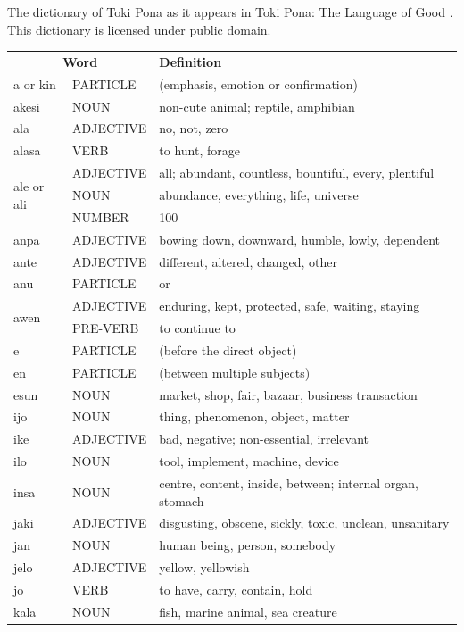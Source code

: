 \documentclass[14pt, a4paper]{extreport}
\begin{document}
The dictionary of Toki Pona as it appears in Toki Pona: The Language of Good \parencite[125-134]{pu}. This dictionary is licensed under public domain.
\begin{longtable}{llp{10cm}}
  \multicolumn{2}{c}{\textbf{Word}} & \textbf{Definition} \\
  a or kin & PARTICLE & (emphasis, emotion or confirmation) \\
  akesi & NOUN & non-cute animal; reptile, amphibian \\
  ala & ADJECTIVE & no, not, zero \\
  alasa & VERB & to hunt, forage \\
  \multirow[t]{3}{*}{ale or ali} & ADJECTIVE & all; abundant, countless, bountiful, every, plentiful \\
  & NOUN & abundance, everything, life, universe \\
  & NUMBER & 100 \\
  anpa & ADJECTIVE & bowing down, downward, humble, lowly, dependent \\
  ante & ADJECTIVE & different, altered, changed, other \\
  anu & PARTICLE & or \\
  \multirow[t]{2}{*}{awen} & ADJECTIVE & enduring, kept, protected, safe, waiting, staying \\
  & PRE-VERB & to continue to \\
  e & PARTICLE & (before the direct object) \\
  en & PARTICLE & (between multiple subjects) \\
  esun & NOUN & market, shop, fair, bazaar, business transaction \\
  ijo & NOUN & thing, phenomenon, object, matter \\
  ike & ADJECTIVE & bad, negative; non-essential, irrelevant \\
  ilo & NOUN & tool, implement, machine, device \\
  insa & NOUN & centre, content, inside, between; internal organ, stomach \\
  jaki & ADJECTIVE & disgusting, obscene, sickly, toxic, unclean, unsanitary \\
  jan & NOUN & human being, person, somebody \\
  jelo & ADJECTIVE & yellow, yellowish \\
  jo & VERB & to have, carry, contain, hold \\
  kala & NOUN & fish, marine animal, sea creature \\

\end{longtable}
\end{document}
